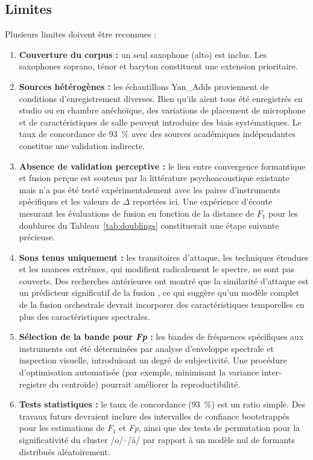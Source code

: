 \documentclass[12pt,a4paper]{article}
\begin{document}
\subsection{Limites}

Plusieurs limites doivent être reconnues :

\begin{enumerate}
\item \textbf{Couverture du corpus :} un seul saxophone (alto) est inclus. Les
saxophones soprano, ténor et baryton constituent une extension prioritaire.

\item \textbf{Sources hétérogènes :} les échantillons Yan\_Adds proviennent de
conditions d'enregistrement diverses. Bien qu'ils aient tous été enregistrés en studio
ou en chambre anéchoïque, des variations de placement de microphone et de
caractéristiques de salle peuvent introduire des biais systématiques. Le taux de
concordance de 93~\% avec des sources académiques indépendantes constitue une
validation indirecte.

\item \textbf{Absence de validation perceptive :} le lien entre convergence formantique
et fusion perçue est soutenu par la littérature psychoacoustique existante
\citep{Sandell1995,Lembke2017} mais n'a pas été testé expérimentalement avec les
paires d'instruments spécifiques et les valeurs de $\Delta$ reportées ici. Une
expérience d'écoute mesurant les évaluations de fusion en fonction de la distance de
$F_1$ pour les doublures du Tableau~\ref{tab:doublings} constituerait une étape
suivante précieuse.

\item \textbf{Sons tenus uniquement :} les transitoires d'attaque, les techniques
étendues et les nuances extrêmes, qui modifient radicalement le spectre, ne sont pas
couverts. Des recherches antérieures ont montré que la similarité d'attaque est un
prédicteur significatif de la fusion \citep{Sandell1995}, ce qui suggère qu'un modèle
complet de la fusion orchestrale devrait incorporer des caractéristiques temporelles
en plus des caractéristiques spectrales.

\item \textbf{Sélection de la bande pour \textit{Fp} :} les bandes de fréquences
spécifiques aux instruments ont été déterminées par analyse d'enveloppe spectrale et
inspection visuelle, introduisant un degré de subjectivité. Une procédure d'optimisation
automatisée (par exemple, minimisant la variance inter-registre du centroïde) pourrait
améliorer la reproductibilité.

\item \textbf{Tests statistiques :} le taux de concordance (93~\%) est un ratio simple.
Des travaux futurs devraient inclure des intervalles de confiance bootstrappés pour
les estimations de $F_1$ et \textit{Fp}, ainsi que des tests de permutation pour la
significativité du cluster /o/--/\aa/ par rapport à un modèle nul de formants
distribués aléatoirement.
\end{enumerate}
\end{document}
